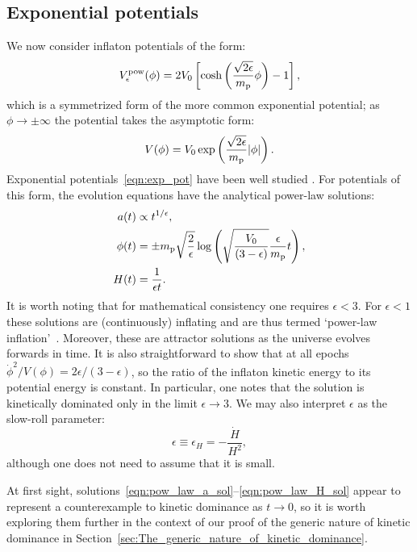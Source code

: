 \subsection{Exponential potentials}
\label{sec:Exponential_potentials}
We now consider inflaton potentials of the form:
%
\begin{equation}
  V^\mathrm{pow}_\epsilon(\phi) 
  = 
  2V_0\left[
  \cosh\left(\frac{\sqrt{2\epsilon}}{m_{\mathrm{p}}}\phi\right)-1
  \right],
  \label{eqn:coshpot}
\end{equation}
%
which is a symmetrized form of the more common exponential potential; as \(\phi\rightarrow\pm\infty\) the potential takes the asymptotic form:
%
\begin{equation}
  V(\phi) 
  = 
  V_0 \exp\left(\frac{\sqrt{2\epsilon}}{m_{\mathrm{p}}} |\phi|\right).
  \label{eqn:exp_pot}
\end{equation}
%
Exponential potentials~\eqref{eqn:exp_pot} have been well studied \citep{yokoyama_dynamics_1988}. For potentials of this form, the evolution equations have the analytical power-law solutions:
%
\begin{align}
  a(t) 
  &\propto 
  {t}^{1/\epsilon},
  \label{eqn:pow_law_a_sol}
  \\
  \phi(t)
  &=
  \pm m_{\mathrm{p}}\sqrt{\frac{2}{\epsilon}}
  \log\left(\sqrt{\frac{V_0}{\left(3-\epsilon\right)}}
  \frac{\epsilon}{m_{\mathrm{p}}} t\right),
  \\
  H(t)
  &=
  \frac{1}{\epsilon t}.  
  \label{eqn:pow_law_H_sol}
\end{align}
%
It is worth noting that for mathematical consistency one requires \(\epsilon < 3\). For \(\epsilon<1\) these solutions are (continuously) inflating and are thus termed `power-law inflation'~\citep{lucchin_power-law_1985}. Moreover, these are attractor solutions as the universe evolves forwards in time. It is also straightforward to show that at all epochs \(\dot{\phi}^2/V(\phi) = 2\epsilon/(3-\epsilon)\), so the ratio of the inflaton kinetic energy to its potential energy is constant. In particular, one notes that the solution is kinetically dominated only in the limit \(\epsilon \to 3\).  We may also interpret \(\epsilon\) as the slow-roll parameter:
%
\begin{equation}
  \epsilon\equiv\epsilon_H = -\frac{\dot{H}}{H^2},
\end{equation}
%
although one does not need to assume that it is small.

At first sight, solutions~\eqref{eqn:pow_law_a_sol}--\eqref{eqn:pow_law_H_sol} appear to represent a counterexample to kinetic dominance as \(t \to 0\), so it is worth exploring them further in the context of our proof of the generic nature of kinetic dominance in Section~\ref{sec:The_generic_nature_of_kinetic_dominance}. 

